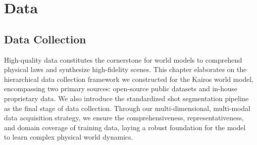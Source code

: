 \section{Data}



\subsection{Data Collection}


High-quality data constitutes the cornerstone for world models to comprehend physical laws and synthesize high-fidelity scenes. This chapter elaborates on the hierarchical data collection framework we constructed for the Kairos world model, encompassing two primary sources: open-source public datasets and in-house proprietary data. We also introduce the standardized shot segmentation pipeline as the final stage of data collection. Through our multi-dimensional, multi-modal data acquisition strategy, we ensure the comprehensiveness, representativeness, and domain coverage of training data, laying a robust foundation for the model to learn complex physical world dynamics.

